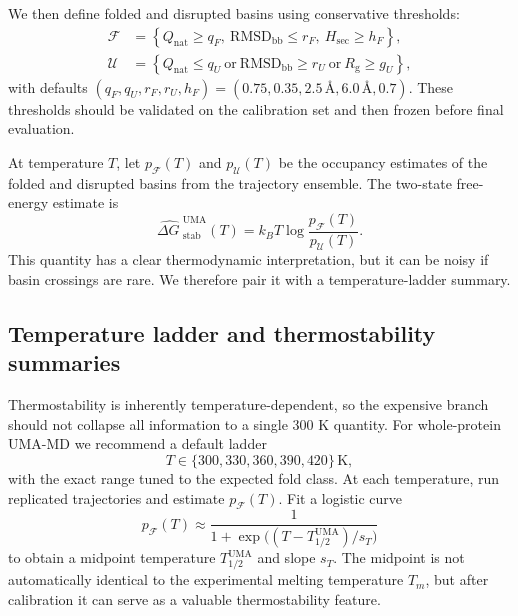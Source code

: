 \documentclass[11pt]{article}
\newcommand{\angstrom}{\ensuremath{\text{\AA}}}
\newcommand{\dG}{\ensuremath{\Delta G \ }}
\begin{document}
We then define folded and disrupted basins using conservative thresholds:
\begin{align}
    \mathcal{F} &= \left\{Q_{\mathrm{nat}}\geq q_F,\ \mathrm{RMSD}_{\mathrm{bb}}\leq r_F,\ H_{\mathrm{sec}}\geq h_F\right\},\\
    \mathcal{U} &= \left\{Q_{\mathrm{nat}}\leq q_U\ \text{or}\ \mathrm{RMSD}_{\mathrm{bb}}\geq r_U\ \text{or}\ R_{\mathrm g}\geq g_U\right\},
\end{align}
with defaults $(q_F,q_U,r_F,r_U,h_F)=(0.75,0.35,2.5\,\angstrom,6.0\,\angstrom,0.7)$. These thresholds should be validated on the calibration set and then frozen before final evaluation.

At temperature $T$, let $p_{\mathcal F}(T)$ and $p_{\mathcal U}(T)$ be the occupancy estimates of the folded and disrupted basins from the trajectory ensemble. The two-state free-energy estimate is
\begin{equation}
\label{eq:twostateg_dup}
    \widehat{\dG}^{\mathrm{UMA}}_{\mathrm{stab}}(T)=k_B T \log\frac{p_{\mathcal{F}}(T)}{p_{\mathcal{U}}(T)}.
\end{equation}
This quantity has a clear thermodynamic interpretation, but it can be noisy if basin crossings are rare. We therefore pair it with a temperature-ladder summary.

\subsection{Temperature ladder and thermostability summaries}

Thermostability is inherently temperature-dependent, so the expensive branch should not collapse all information to a single $300$ K quantity. For whole-protein UMA-MD we recommend a default ladder
\[
T\in\{300,330,360,390,420\}\,\mathrm K,
\]
with the exact range tuned to the expected fold class. At each temperature, run replicated trajectories and estimate $p_{\mathcal F}(T)$. Fit a logistic curve
\begin{equation}
    p_{\mathcal F}(T)\approx \frac{1}{1+\exp\big((T-T_{1/2}^{\mathrm{UMA}})/s_T\big)}
\end{equation}
to obtain a midpoint temperature $T_{1/2}^{\mathrm{UMA}}$ and slope $s_T$. The midpoint is not automatically identical to the experimental melting temperature $T_m$, but after calibration it can serve as a valuable thermostability feature.
\end{document}
